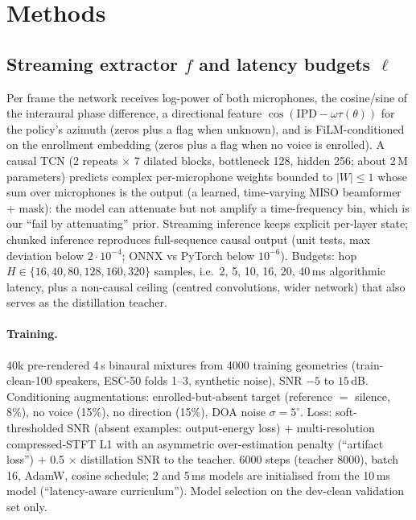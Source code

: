 \section{Methods}
\subsection{Streaming extractor $f$ and latency budgets $\ell$}
Per frame the network receives log-power of both microphones, the cosine/sine of the interaural phase
difference, a directional feature $\cos(\mathrm{IPD}-\omega\tau(\theta))$ for the policy's azimuth
(zeros plus a flag when unknown), and is FiLM-conditioned on the enrollment embedding (zeros plus a flag
when no voice is enrolled). A causal TCN (2 repeats $\times$ 7 dilated blocks, bottleneck 128, hidden 256;
about 2\,M parameters) predicts complex per-microphone weights bounded to $|W|\le 1$ whose sum over
microphones is the output (a learned, time-varying MISO beamformer + mask): the model can attenuate but
not amplify a time-frequency bin, which is our ``fail by attenuating'' prior. Streaming inference keeps
explicit per-layer state; chunked inference reproduces full-sequence causal output (unit tests,
max deviation below $2\cdot 10^{-4}$; ONNX vs PyTorch below $10^{-6}$).
Budgets: hop $H\in\{16,40,80,128,160,320\}$ samples, i.e.\ 2, 5, 10, 16, 20, 40\,ms algorithmic latency,
plus a non-causal ceiling (centred convolutions, wider network) that also serves as the distillation teacher.
\paragraph{Training.} 40k pre-rendered 4\,s binaural mixtures from 4000 training geometries
(train-clean-100 speakers, ESC-50 folds 1--3, synthetic noise), SNR $-5$ to $15$\,dB. Conditioning
augmentations: enrolled-but-absent target (reference $=$ silence, 8\%), no voice (15\%), no direction
(15\%), DOA noise $\sigma=5^\circ$. Loss: soft-thresholded SNR (absent examples: output-energy loss)
\citep{wisdom2020mixit} $+$ multi-resolution compressed-STFT L1 with an asymmetric over-estimation penalty
(``artifact loss'') $+$ 0.5 $\times$ distillation SNR to the teacher. 6000 steps (teacher 8000), batch 16,
AdamW, cosine schedule; 2 and 5\,ms models are initialised from the 10\,ms model (``latency-aware
curriculum''). Model selection on the dev-clean validation set only.

